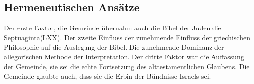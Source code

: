 \documentclass{../../inc/mybib}
\begin{document}
    \subsection{Hermeneutischen Ansätze}
    Der erste Faktor, die Gemeinde übernahm auch die Bibel der Juden die Septuaginta(LXX). Der zweite Einfluss der zunehmende Einfluss der griechischen Philosophie auf die Auslegung der Bibel. Die zunehmende Dominanz der allegorischen Methode der Interpretation. Der dritte Faktor war die Auffassung der Gemeinde, sie sei die echte Fortsetzung des alttestamentlichen Glaubens. Die Gemeinde glaubte auch, dass sie die Erbin der Bündnisse Israels sei.
    
\end{document}
